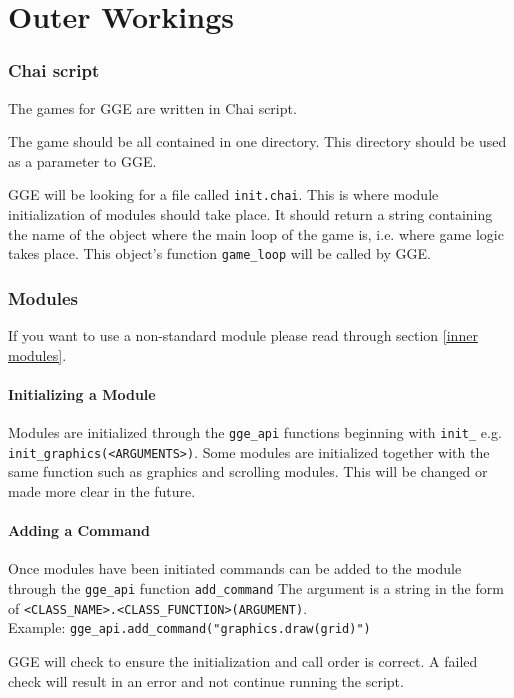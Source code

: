\documentclass{article}
\begin{document}
\part{Outer Workings}

\section{Chai script}
The games for GGE are written in Chai script. 

The game should be all contained in one directory. This directory should be used as a parameter to GGE.

GGE will be looking for a file called \verb|init.chai|. This is where module initialization of modules should take place.
It should return a string containing the name of the object where the main loop of the game is, i.e. where game
logic takes place. This object's function \verb|game_loop| will be called by GGE.

\section{Modules}

If you want to use a non-standard module please read through section \ref{inner modules}.

\subsection{Initializing a Module}
Modules are initialized through the \verb|gge_api| functions beginning with \verb|init_| e.g.
\verb|init_graphics(<ARGUMENTS>)|. 
Some modules are initialized together with the same function such as graphics and scrolling modules. 
This will be changed or made more clear in the future.

\subsection{Adding a Command} \label{adding a command}
Once modules have been initiated commands can be added to the module through the \verb|gge_api| function
\verb|add_command|
The argument is a string in the form of \verb|<CLASS_NAME>.<CLASS_FUNCTION>(ARGUMENT)|.
\\
Example: \verb|gge_api.add_command("graphics.draw(grid)")|

GGE will check to ensure the initialization and call order is correct. 
A failed check will result in an error and not continue running the script.
\end{document}
